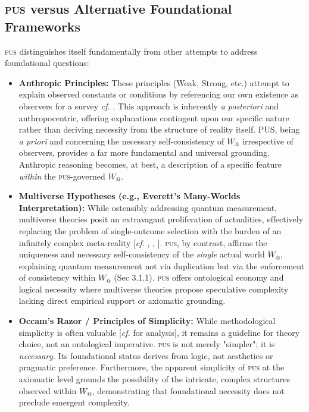\documentclass[11pt, a4paper]{article}
\makeatletter
\newcommand{\pus}{\textsc{pus}} %
\newcommand{\Wactual}{W_{@}} %
\makeatother
\begin{document}
\subsection{\pus{} versus Alternative Foundational Frameworks}
\pus{} distinguishes itself fundamentally from other attempts to address foundational questions:
\begin{itemize}
    \item \textbf{Anthropic Principles:} These principles (Weak, Strong, etc.) attempt to explain observed constants or conditions by referencing our own existence as observers for a survey \textit{cf.} \citealp{barrow1986}. This approach is inherently \textit{a posteriori} and anthropocentric, offering explanations contingent upon our specific nature rather than deriving necessity from the structure of reality itself. PUS, being \textit{a priori} and concerning the necessary self-consistency of $\Wactual$ irrespective of observers, provides a far more fundamental and universal grounding. Anthropic reasoning becomes, at best, a description of a specific feature \textit{within} the \pus-governed $\Wactual$.
    \item \textbf{Multiverse Hypotheses (e.g., Everett's Many-Worlds Interpretation):} While ostensibly addressing quantum measurement, multiverse theories posit an extravagant proliferation of actualities, effectively replacing the problem of single-outcome selection with the burden of an infinitely complex meta-reality [\textit{cf.} \citealp{everett1957}, \citealp{deutsch1997}, \citealp{lewis1986}]. \pus, by contrast, affirms the uniqueness and necessary self-consistency of the \textit{single} actual world $\Wactual$, explaining quantum measurement not via duplication but via the enforcement of consistency within $\Wactual$ (Sec 3.1.1). \pus{} offers ontological economy and logical necessity where multiverse theories propose speculative complexity lacking direct empirical support or axiomatic grounding.
    \item \textbf{Occam's Razor / Principles of Simplicity:} While methodological simplicity is often valuable [\textit{cf.} \citealp{sober2015} for analysis], it remains a guideline for theory choice, not an ontological imperative. \pus{} is not merely "simpler"; it is \textit{necessary}. Its foundational status derives from logic, not aesthetics or pragmatic preference. Furthermore, the apparent simplicity of \pus{} at the axiomatic level grounds the possibility of the intricate, complex structures observed within $\Wactual$, demonstrating that foundational necessity does not preclude emergent complexity.
\end{itemize}
\end{document}
